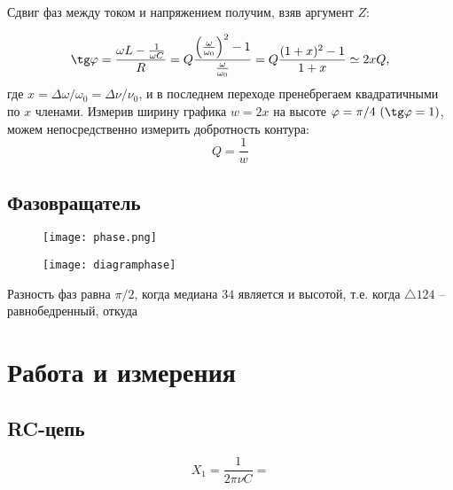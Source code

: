 \documentclass{physlab}
\begin{document}
Сдвиг фаз между током и напряжением получим, взяв аргумент $Z$:

$$\tg\varphi = \frac{\omega L - \frac{1}{\omega C}}{R} = Q\frac{\left(\frac{\omega}{\omega_0}\right)^2 - 1}{\frac{\omega}{\omega_0}} = Q\frac{(1+x)^2-1}{1+x} \simeq 2x Q,$$
где $x = \Delta \omega / \omega_0 = \Delta \nu / \nu_0$, и в последнем переходе пренебрегаем квадратичными по $x$ членами.
Измерив ширину графика $w=2x$ на высоте $\varphi = \pi / 4\ (\tg\varphi = 1)$, можем непосредственно измерить добротность контура:
$$Q = \frac{1}{w}$$

\subsection*{Фазовращатель}

\begin {figure}[H]
\begin{center}
\texttt{[image: phase.png]}
\end{center}
\end {figure}


\begin {figure}[H]
\begin{center}
\texttt{[image: diagramphase]}
\end{center}
\end {figure}

Разность фаз равна $\pi /2$, когда медиана $34$ является и высотой, т.е. когда $\triangle 124$ -- равнобедренный, откуда

\section{Работа и измерения}

\subsection*{RC-цепь}

$$X_1 = \dfrac{1}{2 \pi \nu C} = $$
\end{document}
